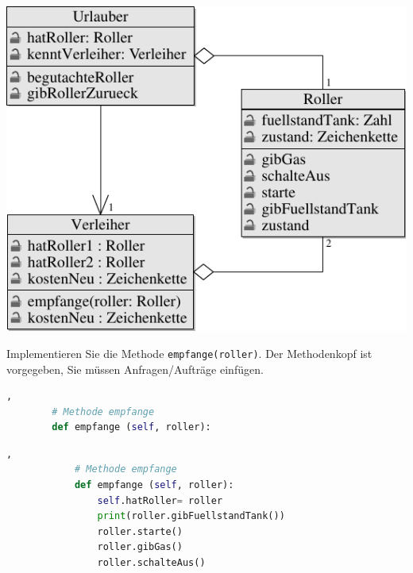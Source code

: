 \documentclass[a4paper]{scrartcl}
\begin{document}
\begin{aufgabe}
\begin{loesung}
\begin{teilaufgaben}
                \includegraphics[scale=0.8]{aufgabe-2}
        \end{teilaufgaben}
    \end{loesung}
    \begin{erwartungen}
    \end{erwartungen}
\end{aufgabe}

\begin{aufgabe}
    Implementieren Sie die Methode \texttt{empfange(roller)}. Der Methodenkopf ist vorgegeben, Sie müssen Anfragen/Aufträge einfügen.
    \begin{lstlisting}[language=python,gobble=8],
        # Methode empfange
        def empfange (self, roller):

    \end{lstlisting}
    \begin{loesung}
        \begin{lstlisting}[language=python,gobble=12],
            # Methode empfange
            def empfange (self, roller):
                self.hatRoller= roller
                print(roller.gibFuellstandTank())
                roller.starte()
                roller.gibGas()
                roller.schalteAus()
        \end{lstlisting}
    \end{loesung}
    \begin{erwartungen}
    \end{erwartungen}
\end{aufgabe}
\end{document}
